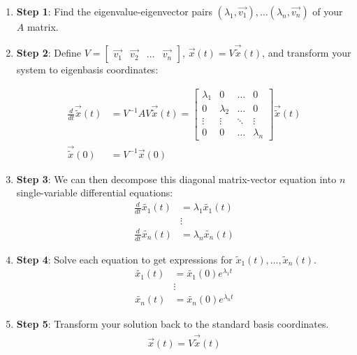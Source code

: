\begin{enumerate}
    \item \textbf{Step 1}: Find the eigenvalue-eigenvector pairs $(\lambda_1, \vec{v_1}), \dots (\lambda_n, \vec{v_n})$ of your $A$ matrix.

    \item \textbf{Step 2}: Define $V = \begin{bmatrix}
        \vec{v_1} & \vec{v_2} & \dots & \vec{v_n}
    \end{bmatrix}$, $\vec{x}(t) = V \vec{\widetilde{x}}(t)$, and transform your system to eigenbasis coordinates:

    \begin{align*}
    \frac{d}{dt} \vec{\widetilde{x}}(t) &=  V^{-1}AV \vec{\widetilde{x}}(t) =
    \begin{bmatrix}
        \lambda_1 & 0 & \dots & 0 \\
        0 & \lambda_2 & \dots & 0 \\
        \vdots & \vdots & \ddots & \vdots \\
        0 & 0 & \dots & \lambda_n
    \end{bmatrix} \vec{\widetilde{x}}(t) \\
    \vec{\widetilde{x}}(0) &= V^{-1} \vec{x}(0)
    \end{align*}

    \item \textbf{Step 3}: We can then decompose this diagonal matrix-vector equation into $n$ single-variable differential equations:
    \begin{align*}
        \frac{d}{dt} \widetilde{x_1}(t) &= \lambda_1 \widetilde{x_1}(t) \\
        &\vdots \\
        \frac{d}{dt} \widetilde{x_n}(t) &= \lambda_n \widetilde{x_n}(t)
    \end{align*}

    \item \textbf{Step 4}: Solve each equation to get expressions for $\widetilde{x}_1(t), \ldots, \widetilde{x}_n(t)$.
    \begin{align*}
        \widetilde{x_1}(t) &= \widetilde{x_1}(0) e^{\lambda_1 t} \\
        &\vdots \\
        \widetilde{x_n}(t) &= \widetilde{x_n}(0) e^{\lambda_n t} 
    \end{align*}

    \item \textbf{Step 5}: Transform your solution back to the standard basis coordinates.
    \begin{align*}
        \vec{x}(t) = V \vec{\widetilde{x}}(t)
    \end{align*}
\end{enumerate}

